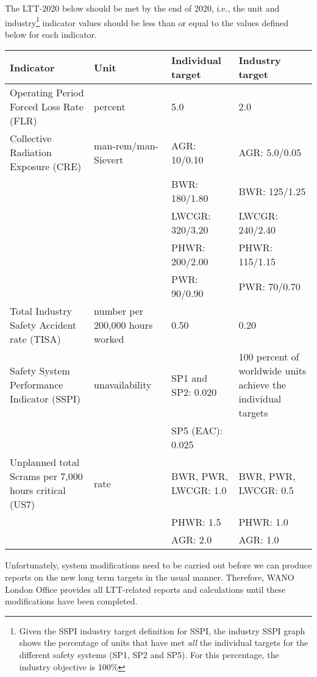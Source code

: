 \documentclass{article}
\begin{document}
The LTT-2020 below should be met by the end of 2020, i.e., the unit and industry\footnote{Given the SSPI industry
  target definition for SSPI, the industry SSPI graph shows the percentage
  of units that have met \emph{all} the individual targets for the different
  safety systems (SP1, SP2 and SP5). For this percentage, the industry
  objective is 100\%} indicator values should be less than or equal to the values defined below for each indicator.

\begin{center}
\begin{tabular}{|p{5cm}|p{3cm}|p{3cm}|p{3cm}|}
\hline
\textbf{Indicator} & \textbf{Unit} & \textbf{Individual target} & \textbf{Industry target} \\
\hline
Operating Period Forced Loss Rate (FLR) & percent & 5.0 & 2.0 \\
\hline
Collective Radiation Exposure (CRE) & man-rem/man-Sievert & AGR: 10/0.10 & AGR: 5.0/0.05 \\
&&BWR: 180/1.80 & BWR: 125/1.25 \\
&&LWCGR: 320/3.20 & LWCGR: 240/2.40 \\
&&PHWR: 200/2.00 & PHWR: 115/1.15\\
&&PWR: 90/0.90 & PWR: 70/0.70 \\
\hline
Total Industry Safety Accident rate (TISA) & number per 200,000 hours worked & 0.50 & 0.20 \\
\hline
Safety System Performance Indicator (SSPI) & unavailability & SP1 and
                                                              SP2:
                                                              0.020
& 100 percent of worldwide units achieve the individual targets\\
&&SP5 (EAC): 0.025&\\
\hline
Unplanned total Scrams per 7,000 hours critical (US7) & rate & BWR, PWR, LWCGR: 1.0 & BWR, PWR, LWCGR: 0.5 \\
&&PHWR: 1.5 & PHWR: 1.0 \\
&&AGR: 2.0 & AGR: 1.0 \\
\hline
\end{tabular}
\end{center}

Unfortunately, system modifications need to be carried out before we can produce reports on the new long term targets in the usual manner. Therefore, WANO London Office provides all LTT-related reports and calculations until these modifications have been completed.
\end{document}
